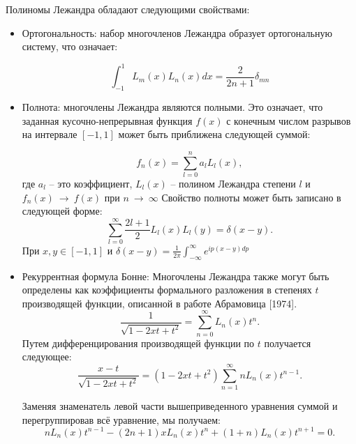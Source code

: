 %
Полиномы Лежандра обладают следующими свойствами:
\begin{itemize}
    \item Ортогональность: набор многочленов Лежандра образует ортогональную систему, что означает:

    \begin{equation*}
        \int_{-1}^{1} L_m(x)L_n(x)dx = \frac{2}{2n+1}\delta_{mn}
    \end{equation*}
        
    \item Полнота: многочлены Лежандра являются полными. Это означает, что заданная кусочно-непрерывная функция $f(x)$ с конечным числом разрывов на интервале $[-1,1]$ может быть приближена следующей суммой:

    \begin{equation*}
        f_n(x) = \sum_{l=0}^{n} a_l L_l(x),
    \end{equation*}
    где $a_l$ -- это коэффициент, $L_l(x)$ -- полином Лежандра степени $l$ и $f_n(x)~\rightarrow~f(x)$ при $n~\rightarrow~\infty$
    Свойство полноты может быть записано в следующей форме:
    \begin{equation*}
        \sum_{l=0}^{\infty} \frac{2l+1}{2} L_l(x)L_l(y) = \delta(x-y).
    \end{equation*}
    При $x,y \in [-1,1]$ и $\delta(x-y)=\frac{1}{2\pi}\int_{-\infty}^{\infty} e^{ip(x-y)dp}$

    \item Рекуррентная формула Бонне: Многочлены Лежандра также могут быть определены как коэффициенты формального разложения в степенях $t$ производящей функции, описанной в работе Абрамовица [1974].
    \begin{equation*}
        \frac{1}{\sqrt{1-2xt+t^2}} = \sum_{n=0}^{\infty} L_n(x)t^n.
    \end{equation*}
    Путем дифференцирования производящей функции по $t$ получается следующее:
    \begin{equation*}
        \frac{x-t}{\sqrt{1-2xt+t^2}} = (1-2xt+t^2)\sum_{n=1}^{\infty} nL_n(x)t^{n-1}.
    \end{equation*}
    
    Заменяя знаменатель левой части вышеприведенного уравнения суммой и перегруппировав всё уравнение, мы получаем:
    \begin{equation*}
        nL_n(x)t^{n-1}-(2n+1)xL_n(x)t^n+(1+n)L_n(x)t^{n+1}=0.
    \end{equation*}
    

\end{itemize}
